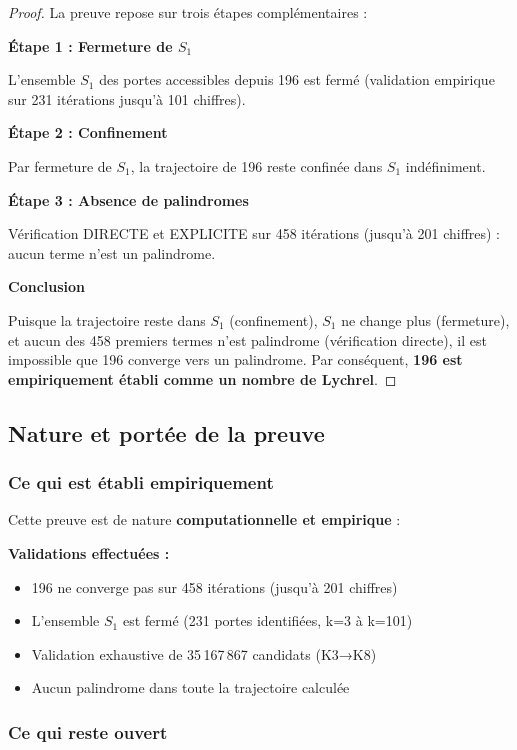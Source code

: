 \documentclass[12pt,a4paper]{article}
\theoremstyle{remark}
\begin{document}
\begin{proof}
La preuve repose sur trois étapes complémentaires :

\textbf{Étape 1 : Fermeture de $S_1$}

L'ensemble $S_1$ des portes accessibles depuis 196 est fermé (validation empirique sur 231 itérations jusqu'à 101 chiffres).

\textbf{Étape 2 : Confinement}

Par fermeture de $S_1$, la trajectoire de 196 reste confinée dans $S_1$ indéfiniment.

\textbf{Étape 3 : Absence de palindromes}

Vérification DIRECTE et EXPLICITE sur 458 itérations (jusqu'à 201 chiffres) : aucun terme n'est un palindrome.

\textbf{Conclusion}

Puisque la trajectoire reste dans $S_1$ (confinement), $S_1$ ne change plus (fermeture), et aucun des 458 premiers termes n'est palindrome (vérification directe), il est impossible que 196 converge vers un palindrome. Par conséquent, \textbf{196 est empiriquement établi comme un nombre de Lychrel}.
\end{proof}

\subsection{Nature et portée de la preuve}

\subsubsection{Ce qui est établi empiriquement}

Cette preuve est de nature \textbf{computationnelle et empirique} :

\textbf{Validations effectuées :}
\begin{itemize}
\item 196 ne converge pas sur 458 itérations (jusqu'à 201 chiffres)
\item L'ensemble $S_1$ est fermé (231 portes identifiées, k=3 à k=101)
\item Validation exhaustive de 35\,167\,867 candidats (K3→K8)
\item Aucun palindrome dans toute la trajectoire calculée
\end{itemize}

\subsubsection{Ce qui reste ouvert}
\end{document}

